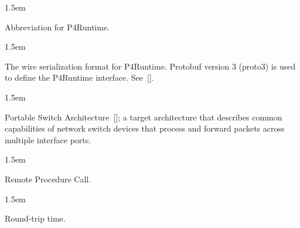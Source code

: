 \documentclass[11pt]{article}
\begin{document}
{\begin{mddefinitions}

\begin{mdbmarginx}{}{}{}{1.5em}%
\begin{mddefdata}%
Abbreviation for P4Runtime.
\end{mddefdata}%
\end{mdbmarginx}%


\begin{mdbmarginx}{}{}{}{1.5em}%
\begin{mddefdata}%
The wire serialization format for P4Runtime. Protobuf version 3 (proto3) is
used to define the P4Runtime interface. See~[].
\end{mddefdata}%
\end{mdbmarginx}%


\begin{mdbmarginx}{}{}{}{1.5em}%
\begin{mddefdata}%
Portable Switch Architecture~[]; a target architecture that describes
common capabilities of network switch devices that process and forward
packets across multiple interface ports.
\end{mddefdata}%
\end{mdbmarginx}%


\begin{mdbmarginx}{}{}{}{1.5em}%
\begin{mddefdata}%
Remote Procedure Call.
\end{mddefdata}%
\end{mdbmarginx}%


\begin{mdbmarginx}{}{}{}{1.5em}%
\begin{mddefdata}%
Round-trip time.
\end{mddefdata}%
\end{mdbmarginx}%



\end{mddefinitions}}
\end{document}
